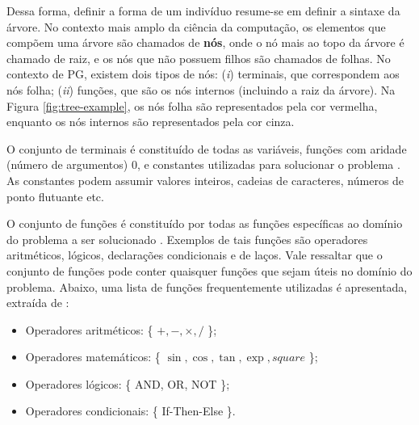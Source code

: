 Dessa forma, definir a forma de um indivíduo resume-se em definir a sintaxe da árvore. No contexto mais amplo da ciência da computação, os elementos que compõem uma árvore são chamados de \textbf{nós}, onde o nó mais ao topo da árvore é chamado de raiz, e os nós que não possuem filhos são chamados de folhas. No contexto de PG, existem dois tipos de nós: (\textit{i}) terminais, que correspondem aos nós folha; (\textit{ii}) funções, que são os nós internos (incluindo a raiz da árvore). Na Figura \ref{fig:tree-example}, os nós folha são representados pela cor vermelha, enquanto os nós internos são representados pela cor cinza.

O conjunto de terminais é constituído de todas as variáveis, funções com aridade (número de argumentos) 0, e constantes utilizadas para solucionar o problema \cite{poli2008,banzhaf1998}. As constantes podem assumir valores inteiros, cadeias de caracteres, números de ponto flutuante etc.

O conjunto de funções é constituído por todas as funções específicas ao domínio do problema a ser solucionado \cite{poli2008}. Exemplos de tais funções são operadores aritméticos, lógicos, declarações condicionais e de laços. Vale ressaltar que o conjunto de funções pode conter quaisquer funções que sejam úteis no domínio do problema. Abaixo, uma lista de funções frequentemente utilizadas é apresentada, extraída de \cite{poli2008,banzhaf1998}:

\begin{itemize}
    \item Operadores aritméticos: \{ $+, -, \times, /$ \};
    \item Operadores matemáticos: \{ $\sin, \cos, \tan, \exp, square$ \};
    \item Operadores lógicos: \{ AND, OR, NOT \};
    \item Operadores condicionais: \{ If-Then-Else \}.
\end{itemize}


